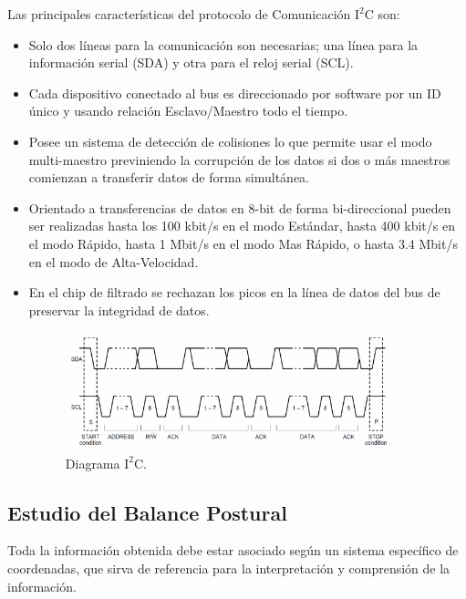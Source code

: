 \documentclass[12pt,a4paper]{article}
\begin{document}
Las principales características del protocolo de Comunicación $\mathrm{I^2C}$ \cite{I2C} son:
\begin{itemize}
	\item Solo dos líneas para la comunicación son necesarias; una línea para la información serial (SDA) y otra para el reloj serial (SCL).
	
	\item Cada dispositivo conectado al bus es direccionado por software por un ID único y usando relación Esclavo/Maestro todo el tiempo.
	
	\item Posee un sistema de detección de colisiones lo que permite usar el modo multi-maestro previniendo la corrupción de los datos si dos o más maestros comienzan a transferir datos de forma simultánea.
	
	\item Orientado a transferencias de datos en 8-bit de forma bi-direccional pueden ser realizadas hasta los 100 kbit/s en el modo Estándar, hasta 400 kbit/s en el modo Rápido, hasta 1 Mbit/s en el modo Mas Rápido, o hasta 3.4 Mbit/s en el modo de Alta-Velocidad.
	
	\item En el chip de filtrado se rechazan los picos en la línea de datos del bus de preservar la integridad de datos.
	
	\begin{figure}[H]
		\centering
		\includegraphics[width=0.9\textwidth]{images/Diagrama_I2C}
		\caption{Diagrama $\mathrm{I^2C.}$}
		\label{fig:diagramaI2C}
	\end{figure}
\end{itemize}

\newpage
\subsection{Estudio del Balance Postural}
Toda la información obtenida debe estar asociado según un sistema específico de coordenadas, que sirva de referencia para la interpretación y comprensión de la información.
\end{document}
